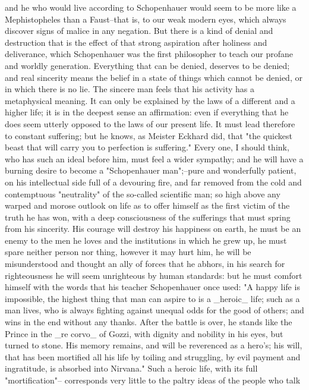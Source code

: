 and he who would live according to Schopenhauer would seem to be more
like a Mephistopheles than a Faust--that is, to our weak modern eyes,
which always discover signs of malice in any negation. But there is a
kind of denial and destruction that is the effect of that strong
aspiration after holiness and deliverance, which Schopenhauer was the
first philosopher to teach our profane and worldly generation.
Everything that can be denied, deserves to be denied; and real
sincerity means the belief in a state of things which cannot be
denied, or in which there is no lie. The sincere man feels that his
activity has a metaphysical meaning. It can only be explained by the
laws of a different and a higher life; it is in the deepest sense an
affirmation: even if everything that he does seem utterly opposed to
the laws of our present life. It must lead therefore to constant
suffering; but he knows, as Meister Eckhard did, that "the quickest
beast that will carry you to perfection is suffering." Every one, I
should think, who has such an ideal before him, must feel a wider
sympathy; and he will have a burning desire to become a "Schopenhauer
man";--pure and wonderfully patient, on his intellectual side full of
a devouring fire, and far removed from the cold and contemptuous
"neutrality" of the so-called scientific man; so high above any
warped and morose outlook on life as to offer himself as the first
victim of the truth he has won, with a deep consciousness of the
sufferings that must spring from his sincerity. His courage will
destroy his happiness on earth, he must be an enemy to the men he
loves and the institutions in which he grew up, he must spare neither
person nor thing, however it may hurt him, he will be misunderstood
and thought an ally of forces that he abhors, in his search for
righteousness he will seem unrighteous by human standards: but he
must comfort himself with the words that his teacher Schopenhauer
once used: "A happy life is impossible, the highest thing that man
can aspire to is a _heroic_ life; such as a man lives, who is always
fighting against unequal odds for the good of others; and wins in the
end without any thanks. After the battle is over, he stands like the
Prince in the _re corvo_ of Gozzi, with dignity and nobility in his
eyes, but turned to stone. His memory remains, and will be reverenced
as a hero's; his will, that has been mortified all his life by
toiling and struggling, by evil payment and ingratitude, is absorbed
into Nirvana." Such a heroic life, with its full "mortification"--
corresponds very little to the paltry ideas of the people who talk
